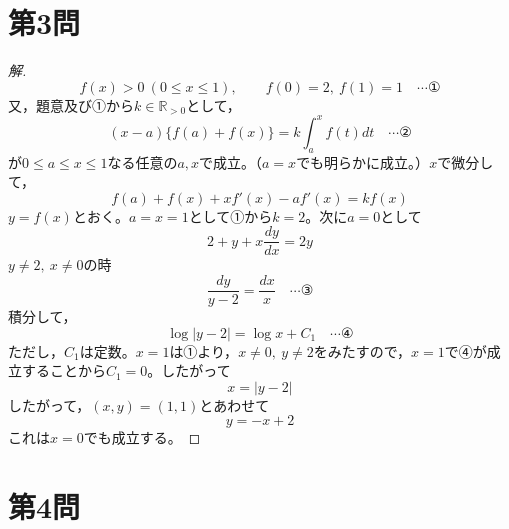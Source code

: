 \documentclass[../main.tex]{subfiles}
\begin{document}
\newpage

\section*{第3問}

\begin{proof}[解]
  \[
    f(x)>0\ (0\le x\le1), \qquad f(0)=2,\ f(1)=1 \quad\cdots\text{①}
  \]
  又，題意及び①から$k\in\mathbb{R}_{>0}$として，
  \[
    (x-a)\{f(a)+f(x)\}=k\int_a^xf(t)dt \quad\cdots\text{②}
  \]
  が$0\le a\le x\le1$なる任意の$a,x$で成立。（$a=x$でも明らかに成立。）$x$で微分して，
  \[
    f(a)+f(x)+xf'(x)-af'(x)=kf(x)
  \]
  $y=f(x)$とおく。$a=x=1$として①から$k=2$。次に$a=0$として
  \[
    2+y+x\frac{dy}{dx}=2y
  \]
  $y\ne2,\ x\ne0$の時
  \[
    \frac{dy}{y-2}=\frac{dx}{x} \quad\cdots\text{③}
  \]
  積分して，
  \[
    \log|y-2|=\log x+C_1 \quad\cdots\text{④}
  \]
  ただし，$C_1$は定数。$x=1$は①より，$x\ne0,\ y\ne2$をみたすので，$x=1$で④が成立することから$C_1=0$。したがって
  \[
    x=|y-2|
  \]
  したがって，$(x,y)=(1,1)$とあわせて
  \[
    y=-x+2
  \]
  これは$x=0$でも成立する。
\end{proof}

\newpage

\section*{第4問}
\end{document}
